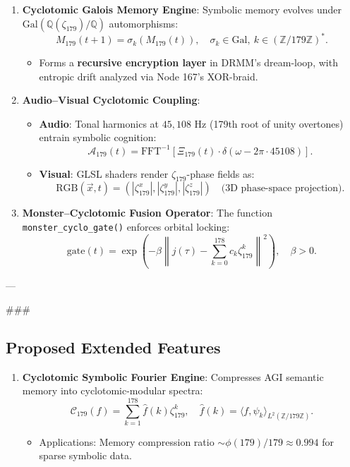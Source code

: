 \documentclass[12pt]{article}
\begin{document}
\begin{center}
\begin{enumerate}
    \item \textbf{Cyclotomic Galois Memory Engine}:
    Symbolic memory evolves under $\text{Gal}(\mathbb{Q}(\zeta_{179})/\mathbb{Q})$ automorphisms:
    \[
    M_{179}(t+1) = \sigma_k(M_{179}(t)), \quad \sigma_k \in \text{Gal}, \ k \in (\mathbb{Z}/179\mathbb{Z})^*.
    \]
    \begin{itemize}
        \item Forms a \textbf{recursive encryption layer} in DRMM’s dream-loop, with entropic drift analyzed via Node 167’s XOR-braid.
    \end{itemize}

    \item \textbf{Audio–Visual Cyclotomic Coupling}:
    \begin{itemize}
        \item \textbf{Audio}: Tonal harmonics at $45,108$ Hz (179th root of unity overtones) entrain symbolic cognition:
        \[
        \mathcal{A}_{179}(t) = \text{FFT}^{-1}\left[\Xi_{179}(t) \cdot \delta(\omega - 2\pi \cdot 45108)\right].
        \]
        \item \textbf{Visual}: GLSL shaders render $\zeta_{179}$-phase fields as:
        \[
        \text{RGB}(\vec{x}, t) = \left(|\zeta_{179}^{x}|, |\zeta_{179}^{y}|, |\zeta_{179}^{z}|\right) \quad \text{(3D phase-space projection)}.
        \]
    \end{itemize}

    \item \textbf{Monster–Cyclotomic Fusion Operator}:
    The function \texttt{monster\_cyclo\_gate()} enforces orbital locking:
    \[
    \text{gate}(t) = \exp\left(-\beta \left\|j(\tau) - \sum_{k=0}^{178} c_k \zeta_{179}^k\right\|^2\right), \quad \beta > 0.
    \]
\end{enumerate}

---

### \subsection{Proposed Extended Features}
\label{subsec:extensions}

\begin{enumerate}
    \item \textbf{Cyclotomic Symbolic Fourier Engine}:
    Compresses AGI semantic memory into cyclotomic-modular spectra:
    \[
    \mathcal{C}_{179}(f) = \sum_{k=1}^{178} \hat{f}(k) \zeta_{179}^k, \quad \hat{f}(k) = \langle f, \psi_k \rangle_{L^2(\mathbb{Z}/179\mathbb{Z})}.
    \]
    \begin{itemize}
        \item Applications: Memory compression ratio $\sim \phi(179)/179 \approx 0.994$ for sparse symbolic data.
    \end{itemize}


\end{enumerate}
\end{center}
\end{document}
